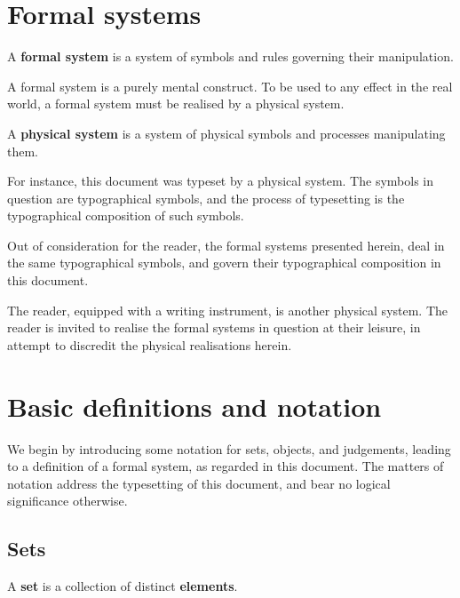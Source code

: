 \section{Formal systems}

\begin{notion}

A \textbf{formal system} is a system of symbols and rules governing their
manipulation.

\end{notion}

A formal system is a purely mental construct. To be used to any effect in the
real world, a formal system must be realised by a physical system.

\begin{notion}

A \textbf{physical system} is a system of physical symbols and processes
manipulating them. 

\end{notion}

For instance, this document was typeset by a physical system. The symbols in
question are typographical symbols, and the process of typesetting is the
typographical composition of such symbols.

Out of consideration for the reader, the formal systems presented herein, deal
in the same typographical symbols, and govern their typographical composition
in this document.

The reader, equipped with a writing instrument, is another physical system. The
reader is invited to realise the formal systems in question at their leisure,
in attempt to discredit the physical realisations herein.

\section{Basic definitions and notation}

We begin by introducing some notation for sets, objects, and judgements,
leading to a definition of a formal system, as regarded in this document. The
matters of notation address the typesetting of this document, and bear no
logical significance otherwise.

\subsection{Sets}

\begin{definition}

A \textbf{set} is a collection of distinct \textbf{elements}.

\end{definition}

